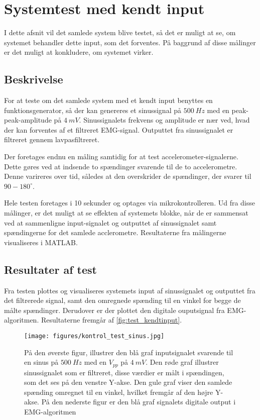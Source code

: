 \section{Systemtest med kendt input}
I dette afsnit vil det samlede system blive testet, så det er muligt at se, om systemet behandler dette input, som det forventes. På baggrund af disse målinger er det muligt at konkludere, om systemet virker. 

\subsection{Beskrivelse}
For at teste om det samlede system med et kendt input benyttes en funktionsgenerator, så der kan genereres et sinussignal på $500~Hz$ med en peak-peak-amplitude på $4~mV$. Sinussignalets frekvens og amplitude er nær ved, hvad der kan forventes af et filtreret EMG-signal. Outputtet fra sinussignalet er filtreret gennem lavpasfiltreret. 

Der foretages endnu en måling  samtidig for at test accelerometer-signalerne. Dette gøres ved at indsende to spændinger svarende til de to accelerometre. Denne varireres over tid, således at den overskrider de spændinger, der svarer til $90-180^{\circ}$.

Hele testen foretages i 10 sekunder og optages via mikrokontrolleren. Ud fra disse målinger, er det muligt at se effekten af systemets blokke, når de er sammensat ved at sammenligne input-signalet og outputtet af sinussignalet samt spændingerne for det samlede acclerometre. Resultaterne fra målingerne visualiseres i MATLAB. 


\subsection{Resultater af test}
Fra testen plottes og visualiseres systemets input af sinussignalet og outputtet fra det filtrerede signal, samt den omregnede spænding til en vinkel for begge de målte spændinger. Derudover er der plottet den digitale ouputsignal fra EMG-algoritmen. Resultaterne fremgår af \autoref{fig:test_kendtinput}. 

\begin{figure}[H]
\centering
\texttt{[image: figures/kontrol\_test\_sinus.jpg]}
\caption{På den øverste figur, illustrer den blå graf inputsignalet svarende til en sinus på $500~Hz$ med en $V_{pp}$ på $4~mV$. Den røde graf illustrer sinussignalet som er filtreret, disse værdier er målt i spændingen, som det ses på den venstre Y-akse. Den gule graf viser den samlede spænding omregnet til en vinkel, hvilket fremgår af den højre Y-akse. På den nederste figur er den blå graf signalets digitale output i EMG-algoritmen}
\label{fig:test_kendtinput}
\end{figure}

